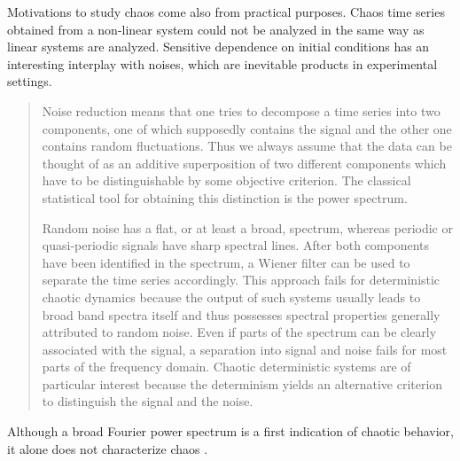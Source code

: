\documentclass[10pt,twoside]{book}
\begin{document}
Motivations to study chaos come also from practical purposes.
Chaos time series obtained from a non-linear system could not be analyzed in the same way as linear systems are analyzed.
Sensitive dependence on initial conditions has an interesting interplay with noises, which are inevitable products in experimental settings.
\citet[p.51]{kantz-schreiber}
\begin{quotation}
  Noise reduction means that one tries to decompose a time series into two components, one of which supposedly contains the signal and the other one contains random fluctuations.
  Thus we always assume that the data can be thought of as an additive superposition of two different components which have to be distinguishable by some objective criterion.
  The classical statistical tool for obtaining this distinction is the power spectrum.

  Random noise has a flat, or at least a broad, spectrum, whereas periodic or quasi-periodic signals have sharp spectral lines.
  After both components have been identified in the spectrum, a Wiener filter can be used to separate the time series accordingly.
  This approach fails for deterministic chaotic dynamics because the output of such systems usually leads to broad band spectra itself and thus possesses spectral properties generally attributed to random noise.
  Even if parts of the spectrum can be clearly associated with the signal, a separation into signal and noise fails for most parts of the frequency domain.
  Chaotic deterministic systems are of particular interest because the determinism yields an alternative criterion to distinguish the signal and the noise. 
\end{quotation}
Although a broad Fourier power spectrum is a first indication of chaotic behavior, it alone does not characterize chaos \citep{abarbanel}.
\end{document}
